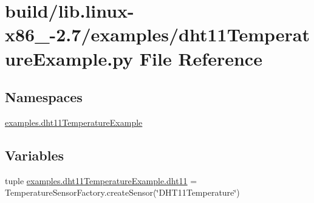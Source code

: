 \hypertarget{build_2lib_8linux-x86__64-2_87_2examples_2dht11TemperatureExample_8py}{}\section{build/lib.linux-\/x86\+\_-\/2.7/examples/dht11\+Temperature\+Example.py File Reference}
\label{build_2lib_8linux-x86__64-2_87_2examples_2dht11TemperatureExample_8py}
\subsection*{Namespaces}
\begin{DoxyCompactItemize}
\item 
 \hyperlink{namespaceexamples_1_1dht11TemperatureExample}{examples.\+dht11\+Temperature\+Example}
\end{DoxyCompactItemize}
\subsection*{Variables}
\begin{DoxyCompactItemize}
\item 
tuple \hyperlink{namespaceexamples_1_1dht11TemperatureExample_acae944ec2fea4b2036291646fb56e0b7}{examples.\+dht11\+Temperature\+Example.\+dht11} = Temperature\+Sensor\+Factory.\+create\+Sensor(\char`\"{}D\+H\+T11\+Temperature\char`\"{})
\end{DoxyCompactItemize}
